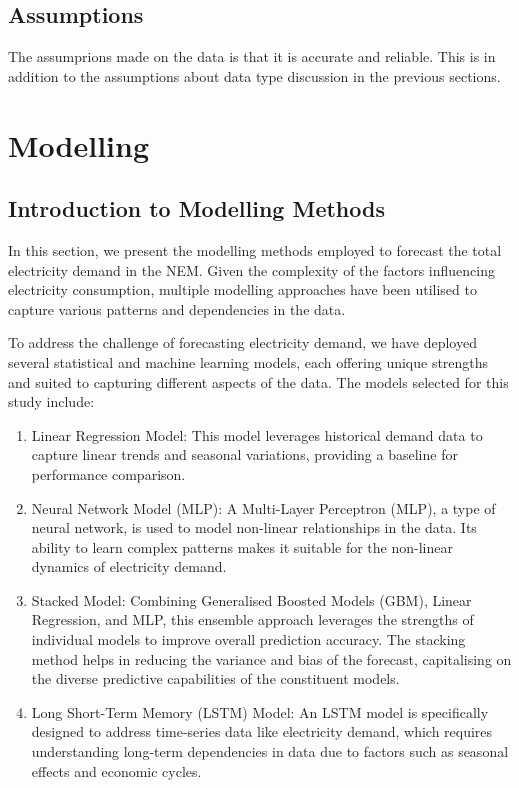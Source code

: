 \documentclass[
]{article}
\providecommand{\tightlist}{%
  \setlength{\itemsep}{0pt}\setlength{\parskip}{0pt}}
\begin{document}
\subsection{Assumptions}\label{assumptions}

The assumprions made on the data is that it is accurate and reliable.
This is in addition to the assumptions about data type discussion in the
previous sections.

\section{Modelling}\label{modelling}

\subsection{Introduction to Modelling
Methods}\label{introduction-to-modelling-methods}

In this section, we present the modelling methods employed to forecast
the total electricity demand in the NEM. Given the complexity of the
factors influencing electricity consumption, multiple modelling
approaches have been utilised to capture various patterns and
dependencies in the data.

To address the challenge of forecasting electricity demand, we have
deployed several statistical and machine learning models, each offering
unique strengths and suited to capturing different aspects of the data.
The models selected for this study include:

\begin{enumerate}
\def\labelenumi{\arabic{enumi}.}
\tightlist
\item
  Linear Regression Model: This model leverages historical demand data
  to capture linear trends and seasonal variations, providing a baseline
  for performance comparison.
\item
  Neural Network Model (MLP): A Multi-Layer Perceptron (MLP), a type of
  neural network, is used to model non-linear relationships in the data.
  Its ability to learn complex patterns makes it suitable for the
  non-linear dynamics of electricity demand.
\item
  Stacked Model: Combining Generalised Boosted Models (GBM), Linear
  Regression, and MLP, this ensemble approach leverages the strengths of
  individual models to improve overall prediction accuracy. The stacking
  method helps in reducing the variance and bias of the forecast,
  capitalising on the diverse predictive capabilities of the constituent
  models.
\item
  Long Short-Term Memory (LSTM) Model: An LSTM model is specifically
  designed to address time-series data like electricity demand, which
  requires understanding long-term dependencies in data due to factors
  such as seasonal effects and economic cycles.
\end{enumerate}
\end{document}
